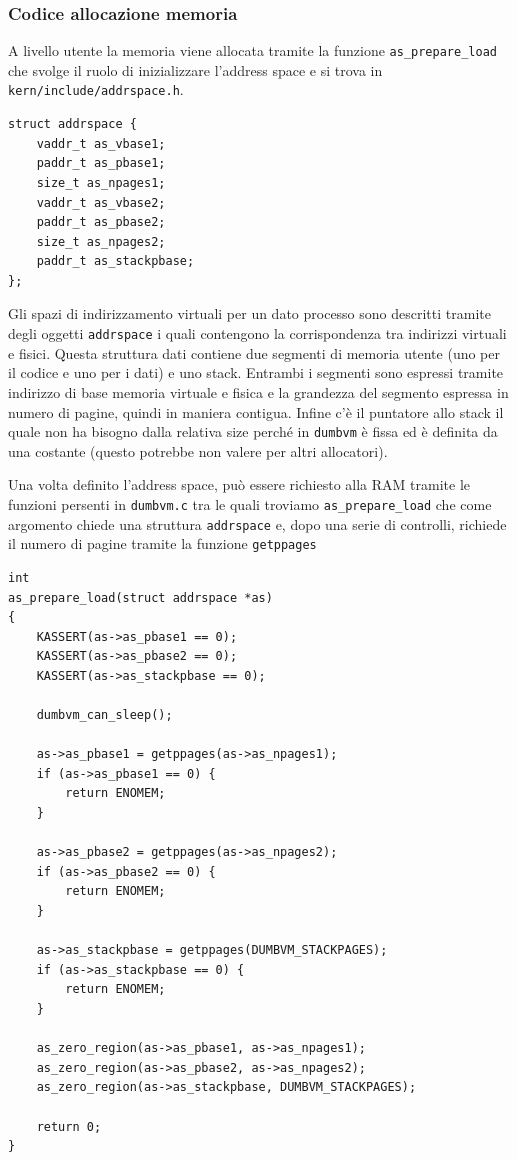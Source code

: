 \subsubsection{Codice allocazione memoria}
A livello utente la memoria viene allocata tramite la funzione \lstinline{as_prepare_load} che svolge il ruolo di inizializzare l'address space e si trova in \lstinline{kern/include/addrspace.h}.
\begin{lstlisting}[caption={struttura \lstinline{addrspace}}]
struct addrspace {
    vaddr_t as_vbase1;
    paddr_t as_pbase1;
    size_t as_npages1;
    vaddr_t as_vbase2;
    paddr_t as_pbase2;
    size_t as_npages2;
    paddr_t as_stackpbase;
};
\end{lstlisting}
Gli spazi di indirizzamento virtuali per un dato processo sono descritti tramite degli oggetti \lstinline{addrspace} i quali contengono la corrispondenza tra indirizzi virtuali e fisici. Questa struttura dati contiene due segmenti di memoria utente (uno per il codice e uno per i dati) e uno stack. Entrambi i segmenti sono espressi tramite indirizzo di base memoria virtuale e fisica e la grandezza del segmento espressa in numero di pagine, quindi in maniera contigua. Infine c'è il puntatore allo stack il quale non ha bisogno dalla relativa size perché in \lstinline{dumbvm} è fissa ed è definita da una costante (questo potrebbe non valere per altri allocatori).

Una volta definito l'address space, può essere richiesto alla RAM tramite le funzioni persenti in \lstinline{dumbvm.c} tra le quali troviamo \lstinline{as_prepare_load} che come argomento chiede una struttura \lstinline{addrspace} e, dopo una serie di controlli, richiede il numero di pagine tramite la funzione \lstinline{getppages} 
\begin{lstlisting}[caption={\lstinline{as_prepare_load} in \lstinline{dumbvm.c}}]
int
as_prepare_load(struct addrspace *as)
{
	KASSERT(as->as_pbase1 == 0);
	KASSERT(as->as_pbase2 == 0);
	KASSERT(as->as_stackpbase == 0);

	dumbvm_can_sleep();

	as->as_pbase1 = getppages(as->as_npages1);
	if (as->as_pbase1 == 0) {
		return ENOMEM;
	}

	as->as_pbase2 = getppages(as->as_npages2);
	if (as->as_pbase2 == 0) {
		return ENOMEM;
	}

	as->as_stackpbase = getppages(DUMBVM_STACKPAGES);
	if (as->as_stackpbase == 0) {
		return ENOMEM;
	}

	as_zero_region(as->as_pbase1, as->as_npages1);
	as_zero_region(as->as_pbase2, as->as_npages2);
	as_zero_region(as->as_stackpbase, DUMBVM_STACKPAGES);

	return 0;
}
\end{lstlisting}


